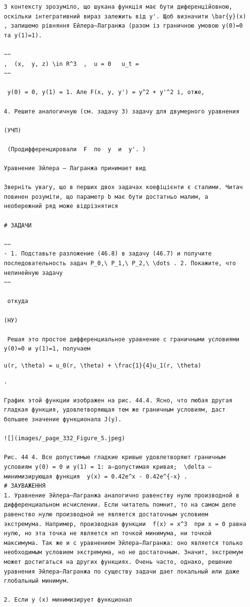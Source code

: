 \documentclass[
  ukrainian,
]{article}
\begin{document}
\begin{verbatim}
З контексту зрозуміло, що шукана функція має бути диференційовною, оскільки інтегративний вираз залежить від y'. Щоб визначити \bar{y}(x) , запишемо рівняння Ейлера–Лагранжа (разом із граничною умовою y(0)=0 та y(1)=1).

~~
,  (x,  y, z) \in R^3  ,  u = 0   u_t =
~~

 y(0) = 0, y(1) = 1. Але F(x, y, y') = y^2 + y'^2 і, отже,

4. Решите аналогичную (см. задачу 3) задачу для двумерного уравнения

(УЧП)

 (Продифференцировали  F  по  y  и  y'. )

Уравнение Эйлера — Лагранжа принимает вид

Зверніть увагу, що в перших двох задачах коефіцієнти є сталими. Читач повинен розуміти, що параметр b має бути достатньо малим, а необережний ряд може відрізнятися

# ЗАДАЧИ

~~
- 1. Подставьте разложение (46.8) в задачу (46.7) и получите последовательность задач P_0,\ P_1,\ P_2,\ \dots . 2. Покажите, что нелинейную задачу
~~

 откуда

(НУ)

 Решая это простое дифференциальное уравнение с граничными условиями y(0)=0 и y(1)=1, получаем
\end{verbatim}

\texttt{u(r,\ \textbackslash{}theta)\ =\ u\_0(r,\ \textbackslash{}theta)\ +\ \textbackslash{}frac\{1\}\{4\}u\_1(r,\ \textbackslash{}theta)}

\begin{verbatim}
.

График этой функции изображен на рис. 44.4. Ясно, что любая другая гладкая функция, удовлетворяющая тем же граничным условиям, даст большее значение функционала J(y).

![](images/_page_332_Figure_5.jpeg)

Рис. 44 4. Все допустимые гладкие кривые удовлетворяют граничным условиям y(0) = 0 и y(1) = 1: a—допустимая кривая;  \delta —минимизирующая функция  y(x) = 0.42e^x - 0.42e^{-x} .
# ЗАУВАЖЕННЯ
1. Уравнение Эйлера—Лагранжа аналогично равенству нулю производной в дифференциальном исчислении. Если читатель помнит, то на самом деле равенство нулю производной не является достаточным условием экстремума. Например, производная функции  f(x) = x^3  при x = 0 равна нулю, но эта точка не является нп точкой минимума, ни точкой максимума. Так же и с уравнением Эйлера—Лагранжа: оно является только необходимым условием экстремума, но не достаточным. Значит, экстремум может достигаться на других функциях. Очень часто, однако, решение уравнения Эйлера—Лагранжа по существу задачи дает локальный или даже глобальный минимум.

2. Если у (х) минимизирует функционал
\end{verbatim}
\end{document}
